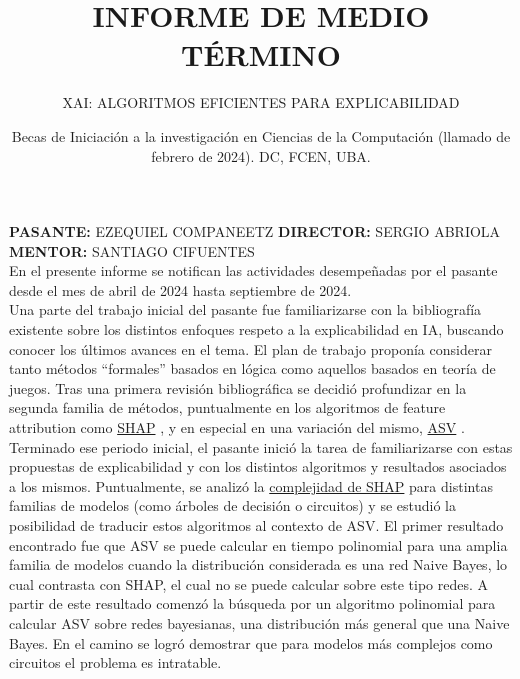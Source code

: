 \documentclass[10pt,a4paper]{article}
\title{\textbf{INFORME DE MEDIO TÉRMINO}}
\author{\uppercase{XAI: Algoritmos eficientes para explicabilidad}}
\date{Becas de Iniciación a la investigación en Ciencias de la Computación (llamado de febrero de 2024). DC, FCEN, UBA.}
\begin{document}

\maketitle
\noindent
\textbf{PASANTE:} \uppercase{Ezequiel Companeetz}
\noindent \newline
\textbf{DIRECTOR:} \uppercase{Sergio Abriola}
\noindent \newline
\textbf{MENTOR:} \uppercase{Santiago Cifuentes}
\\

En el presente informe se notifican las actividades desempeñadas por el pasante desde el mes de abril de 2024 hasta septiembre de 2024.\\
Una parte del trabajo inicial del pasante fue familiarizarse con la bibliografía existente sobre los distintos enfoques respeto a la explicabilidad en IA, buscando conocer los últimos avances en el tema. El plan de trabajo proponía considerar tanto métodos ``formales'' basados en lógica como aquellos basados en teoría de juegos. Tras una primera revisión bibliográfica se decidió profundizar en la segunda familia de métodos, puntualmente en los algoritmos de feature attribution como \href{https://arxiv.org/pdf/1705.07874}{SHAP} \cite{lundberg2017unified}, y en especial en una variación del mismo, \href{https://arxiv.org/pdf/1910.06358}{ASV} \cite{frye2019asymmetric}.
Terminado ese periodo inicial, el pasante inició la tarea de familiarizarse con estas propuestas de explicabilidad y con los distintos algoritmos y resultados asociados a los mismos. Puntualmente, se analizó la \href{https://arxiv.org/abs/2009.08634}{complejidad de SHAP} \cite{van2022tractability} para distintas familias de modelos (como árboles de decisión o circuitos) y se estudió la posibilidad de traducir estos algoritmos al contexto de ASV. El primer resultado encontrado fue que ASV se puede calcular en tiempo polinomial para una amplia familia de modelos cuando la distribución considerada es una red Naive Bayes, lo cual contrasta con SHAP, el cual no se puede calcular sobre este tipo redes. A partir de este resultado comenzó la búsqueda por un algoritmo polinomial para calcular ASV sobre redes bayesianas, una distribución más general que una Naive Bayes. En el camino se logró demostrar que para modelos más complejos como circuitos el problema es intratable. 
\end{document}
